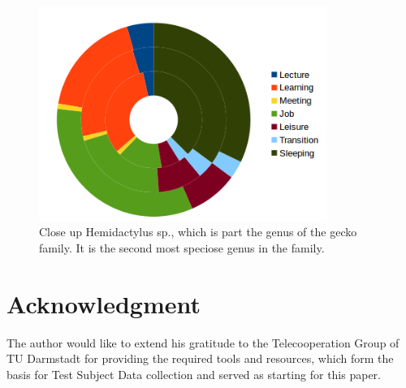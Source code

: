 \documentclass[conference]{IEEEtran}
\begin{document}
\begin{figure}[hb]
  \centering
  \includegraphics[width=3.7in]{donut}
  \caption[]
   {Close up Hemidactylus sp., which is
   part the genus of the gecko family. It is the
   second most speciose genus in the family.}
\end{figure}

\section*{Acknowledgment}
The author would like to extend his gratitude to the Telecooperation Group of TU Darmstadt for providing the required tools and resources, which form the basis for Test Subject Data collection and served as starting for this paper.




\end{document}
